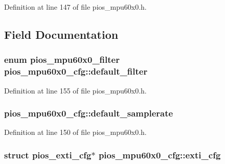 Definition at line 147 of file pios\-\_\-mpu60x0.\-h.



\subsection{Field Documentation}
\hypertarget{structpios__mpu60x0__cfg_a50a6612b9fff2bd96908996d7d734ef3}{
\subsubsection[{default\-\_\-filter}]{\setlength{\rightskip}{0pt plus 5cm}enum {\bf pios\-\_\-mpu60x0\-\_\-filter} pios\-\_\-mpu60x0\-\_\-cfg\-::default\-\_\-filter}}\label{structpios__mpu60x0__cfg_a50a6612b9fff2bd96908996d7d734ef3}


Definition at line 155 of file pios\-\_\-mpu60x0.\-h.

\hypertarget{structpios__mpu60x0__cfg_af4581a0013e107281a5ebefa0745d6ff}{
\subsubsection[{default\-\_\-samplerate}]{ pios\-\_\-mpu60x0\-\_\-cfg\-::default\-\_\-samplerate}}\label{structpios__mpu60x0__cfg_af4581a0013e107281a5ebefa0745d6ff}


Definition at line 150 of file pios\-\_\-mpu60x0.\-h.

\hypertarget{structpios__mpu60x0__cfg_a3060efb7fe61ef6816d0c76c464bd3f9}{
\subsubsection[{exti\-\_\-cfg}]{\setlength{\rightskip}{0pt plus 5cm}struct {\bf pios\-\_\-exti\-\_\-cfg}$\ast$ pios\-\_\-mpu60x0\-\_\-cfg\-::exti\-\_\-cfg}}\label{structpios__mpu60x0__cfg_a3060efb7fe61ef6816d0c76c464bd3f9}


